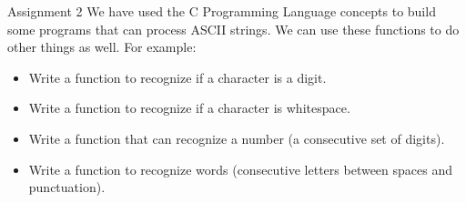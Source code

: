 \documentclass[10pt]{beamer}
\begin{document}
\begin{frame}[fragile]{Assignment 2}
We have used the C Programming Language concepts to build some programs that can process ASCII strings.  We can use these functions to do other things as well.  For example:

\begin{itemize}
\item Write a function to recognize if a character is a digit.
\item Write a function to recognize if a character is whitespace.
\item Write a function that can recognize a number (a consecutive set of digits).
\item Write a function to recognize words (consecutive letters between spaces and punctuation).
\end{itemize}
\end{frame}
\end{document}
